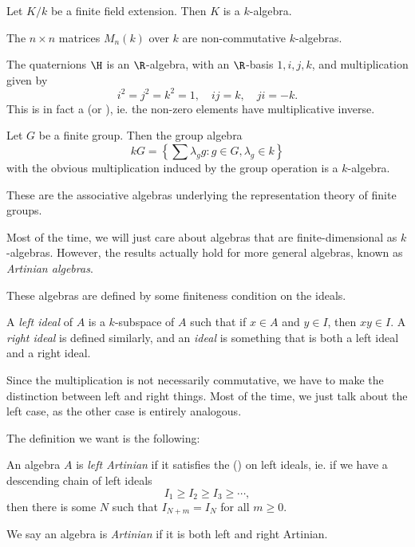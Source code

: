 \documentclass[a4paper]{article}
\begin{document}
\begin{eg}
  Let $K/k$ be a finite field extension. Then $K$ is a $k$-algebra.
\end{eg}

\begin{eg}
  The $n\times n$ matrices $M_n(k)$ over $k$ are non-commutative $k$-algebras.
\end{eg}

\begin{eg}
  The quaternions $\H$ is an $\R$-algebra, with an $\R$-basis $1, i, j, k$, and multiplication given by
  \[
    i^2 = j^2 = k^2 = 1,\quad ij = k,\quad ji = -k.
  \]
  This is in fact a  (or ), ie. the non-zero elements have multiplicative inverse.
\end{eg}

\begin{eg}
  Let $G$ be a finite group. Then the group algebra
  \[
    kG = \left\{\sum \lambda_g g: g \in G, \lambda_g \in k\right\}
  \]
  with the obvious multiplication induced by the group operation is a $k$-algebra.

  These are the associative algebras underlying the representation theory of finite groups.
\end{eg}

Most of the time, we will just care about algebras that are finite-dimensional as $k$-algebras. However, the results actually hold for more general algebras, known as \emph{Artinian algebras}.

These algebras are defined by some finiteness condition on the ideals.

\begin{defi}[Ideal]
  A \emph{left ideal} of $A$ is a $k$-subspace of $A$ such that if $x \in A$ and $y \in I$, then $xy \in I$. A \emph{right ideal} is defined similarly, and an \emph{ideal} is something that is both a left ideal and a right ideal.
\end{defi}
Since the multiplication is not necessarily commutative, we have to make the distinction between left and right things. Most of the time, we just talk about the left case, as the other case is entirely analogous.

The definition we want is the following:
\begin{defi}
  An algebra $A$ is \emph{left Artinian} if it satisfies the  () on left ideals, ie. if we have a descending chain of left ideals
  \[
    I_1 \geq I_2 \geq I_3 \geq \cdots,
  \]
  then there is some $N$ such that $I_{N + m} = I_{N}$ for all $m \geq 0$.

  We say an algebra is \emph{Artinian} if it is both left and right Artinian.
\end{defi}
\end{document}
